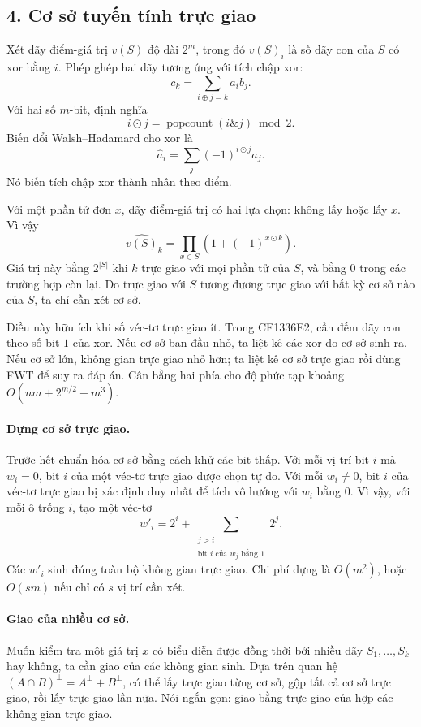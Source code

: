 \documentclass[11pt]{article}
\begin{document}
\subsection*{4. Cơ sở tuyến tính trực giao}

Xét dãy điểm-giá trị \(v(S)\) độ dài \(2^m\), trong đó \(v(S)_i\) là số dãy con
của \(S\) có xor bằng \(i\). Phép ghép hai dãy tương ứng với tích chập xor:
\[
  c_k=\sum_{i\oplus j=k}a_i b_j.
\]
Với hai số \(m\)-bit, định nghĩa
\[
  i\odot j=\operatorname{popcount}(i\&j)\bmod 2.
\]
Biến đổi Walsh--Hadamard cho xor là
\[
  \widehat a_i=\sum_j (-1)^{i\odot j}a_j.
\]
Nó biến tích chập xor thành nhân theo điểm.

Với một phần tử đơn \(x\), dãy điểm-giá trị có hai lựa chọn: không lấy hoặc lấy
\(x\). Vì vậy
\[
  \widehat{v(S)}_k=\prod_{x\in S}\left(1+(-1)^{x\odot k}\right).
\]
Giá trị này bằng \(2^{|S|}\) khi \(k\) trực giao với mọi phần tử của \(S\), và
bằng \(0\) trong các trường hợp còn lại. Do trực giao với \(S\) tương đương
trực giao với bất kỳ cơ sở nào của \(S\), ta chỉ cần xét cơ sở.

Điều này hữu ích khi số véc-tơ trực giao ít. Trong CF1336E2, cần đếm dãy con
theo số bit \(1\) của xor. Nếu cơ sở ban đầu nhỏ, ta liệt kê các xor do cơ sở
sinh ra. Nếu cơ sở lớn, không gian trực giao nhỏ hơn; ta liệt kê cơ sở trực
giao rồi dùng FWT để suy ra đáp án. Cân bằng hai phía cho độ phức tạp khoảng
\(O(nm+2^{m/2}+m^3)\).

\paragraph{Dựng cơ sở trực giao.}
Trước hết chuẩn hóa cơ sở bằng cách khử các bit thấp. Với mỗi vị trí bit
\(i\) mà \(w_i=0\), bit \(i\) của một véc-tơ trực giao được chọn tự do. Với mỗi
\(w_i\ne0\), bit \(i\) của véc-tơ trực giao bị xác định duy nhất để tích vô
hướng với \(w_i\) bằng \(0\). Vì vậy, với mỗi ô trống \(i\), tạo một véc-tơ
\[
  w'_i=2^i+\sum_{\substack{j>i\\ \text{bit }i\text{ của }w_j\text{ bằng }1}}2^j.
\]
Các \(w'_i\) sinh đúng toàn bộ không gian trực giao. Chi phí dựng là
\(O(m^2)\), hoặc \(O(sm)\) nếu chỉ có \(s\) vị trí cần xét.

\paragraph{Giao của nhiều cơ sở.}
Muốn kiểm tra một giá trị \(x\) có biểu diễn được đồng thời bởi nhiều dãy
\(S_1,\ldots,S_k\) hay không, ta cần giao của các không gian sinh. Dựa trên
quan hệ \((A\cap B)^\perp=A^\perp+B^\perp\), có thể lấy trực giao từng cơ sở,
gộp tất cả cơ sở trực giao, rồi lấy trực giao lần nữa. Nói ngắn gọn: giao bằng
trực giao của hợp các không gian trực giao.
\end{document}
